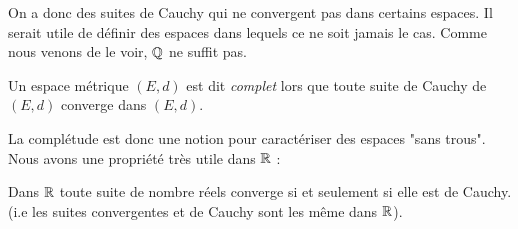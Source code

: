 On a donc des suites de Cauchy qui ne convergent pas dans certains espaces. Il serait utile de définir 
des espaces dans lequels ce ne soit jamais le cas. Comme nous venons de le voir, $\mathbb{Q}$ ne suffit pas. 

\begin{definition}
    Un espace métrique $(E,d)$ est dit \emph{complet} lors que toute suite de Cauchy de $(E,d)$ converge dans $(E,d)$. 
\end{definition}

La complétude est donc une notion pour caractériser des espaces "sans trous". Nous avons une propriété très utile dans $\mathbb{R}$ : 

\begin{prop}
    Dans $\mathbb{R}$ toute suite de nombre réels converge si et seulement si elle est de Cauchy. 
    (i.e les suites convergentes et de Cauchy sont les même dans $\mathbb{R}$). 
\end{prop}

